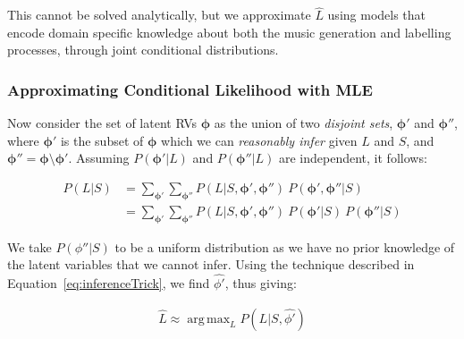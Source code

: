 \documentclass[12pt,a4paper,twoside,openright]{report}
\DeclareMathOperator*{\argmax}{arg\,max}
\theoremstyle{definition}
\begin{document}
This cannot be solved analytically, but we approximate $\hat{L}$ using models that encode domain specific knowledge about both the music generation and labelling processes, through joint conditional distributions. 

\subsubsection{Approximating Conditional Likelihood with MLE}

Now consider the set of latent RVs $\bm{\phi}$ as the union of two \textit{disjoint sets}, $\bm{\phi'}$ and $\bm{\phi''}$, where $\bm{\phi'}$ is the subset of $\bm{\phi}$ which we can \textit{reasonably infer} given $L$ and $S$, and $\bm{\phi''} = \bm{\phi} \setminus \bm{\phi}'$. Assuming $P(\bm{\phi'} | L)$ and $P(\bm{\phi''} | L)$ are independent, it follows:

\begin{equation}
  \begin{align}
    P(L|S) &= \sum\limits_{\bm{\phi'}}\sum\limits_{\bm{\phi''}} P(L | S,\bm{\phi'},\bm{ \phi'' })~P(\bm{ \phi' }, \bm{ \phi'' } |S) \\
           &= \sum\limits_{\bm{\phi'}}\sum\limits_{\bm{\phi''}} P(L | S,\bm{\phi'},\bm{\phi''})~P(\bm{\phi'} | S)~P(\bm{\phi''} |S) 
  \end{align}
  \label{eq:aceProbSolLatent}
\end{equation}

We take $P(\phi''|S)$ to be a uniform distribution as we have no prior knowledge of the latent variables that we cannot infer. 
Using the technique described in Equation~\ref{eq:inferenceTrick}, we find $\hat{\phi'}$, thus giving: 

\begin{equation}
  \begin{align}
    \hat L \approx \argmax_L P(L | S, \hat{\phi'})
  \end{align}
  \label{eq:aceProbSolLatent}
\end{equation}








\end{document}
